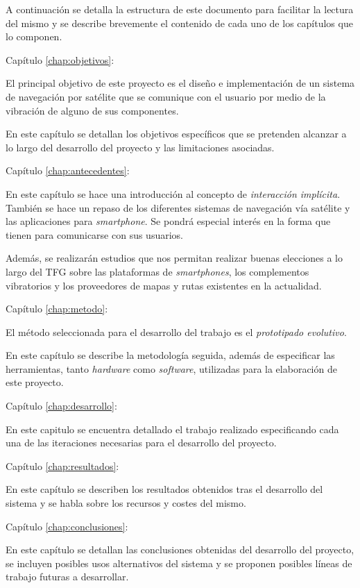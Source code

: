 A continuación se detalla la estructura de este documento para facilitar la lectura del mismo y
se describe brevemente el contenido de cada uno de los capítulos que lo componen.

\begin{definitionlist}
  \item[Capítulo \ref{chap:objetivos}: \nameref{chap:objetivos}] 

  El principal objetivo de este proyecto es el diseño e implementación de un sistema de navegación
  por satélite que se comunique con el usuario por medio de la vibración de alguno de sus
  componentes.

  En este capítulo se detallan los objetivos específicos que se pretenden alcanzar a lo largo
  del desarrollo del proyecto y las limitaciones asociadas.

  \item[Capítulo \ref{chap:antecedentes}: \nameref{chap:antecedentes}]

  En este capítulo se hace una introducción al concepto de \emph{interacción implícita}. También se
  hace un repaso de los diferentes sistemas de navegación vía satélite y las aplicaciones para
  \emph{smartphone}. Se pondrá especial interés en la forma que tienen para comunicarse con sus
  usuarios.

  Además, se realizarán estudios que nos permitan realizar buenas elecciones a lo largo del
  \acs{TFG} sobre las plataformas de \emph{smartphones}, los complementos vibratorios y los
  proveedores de mapas y rutas existentes en la actualidad.

  \item[Capítulo \ref{chap:metodo}: \nameref{chap:metodo}]

  El método seleccionada para el desarrollo del trabajo es el \emph{prototipado evolutivo}.

  En este capítulo se describe la metodología seguida, además de especificar las herramientas, tanto
  \emph{hardware} como \emph{software}, utilizadas para la elaboración de este proyecto.

  \item[Capítulo \ref{chap:desarrollo}: \nameref{chap:desarrollo}]

  En este capitulo se encuentra detallado el trabajo realizado especificando cada una de las
  iteraciones necesarias para el desarrollo del proyecto.

  \item[Capítulo \ref{chap:resultados}: \nameref{chap:resultados}]

  En este capítulo se describen los resultados obtenidos tras el desarrollo del sistema y se habla
  sobre los recursos y costes del mismo.

  \item[Capítulo \ref{chap:conclusiones}: \nameref{chap:conclusiones}]

  En este capítulo se detallan las conclusiones obtenidas del desarrollo del proyecto, se
  incluyen posibles usos alternativos del sistema y se proponen posibles líneas de trabajo
  futuras a desarrollar.

\end{definitionlist}


